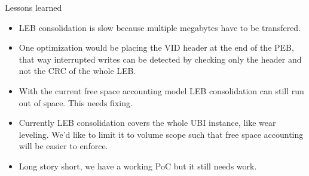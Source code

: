 \documentclass[aspectratio=169,obeyspaces,spaces,hyphens,dvipsnames]{beamer}
\begin{document}
\begin{frame}{Lessons learned}
  \begin{itemize}
  \item LEB consolidation is slow because multiple megabytes have to be transfered.
  \item One optimization would be placing the VID header at the end of the PEB,
        that way interrupted writes can be detected by checking only the header and
        not the CRC of the whole LEB.
  \item With the current free space accounting model LEB consolidation can still run out of
        space. This needs fixing.
  \item Currently LEB consolidation covers the whole UBI instance, like wear leveling.
        We'd like to limit it to volume scope such that free space accounting will be easier
        to enforce.
  \item Long story short, we have a working PoC but it still needs work.
  \end{itemize}
\end{frame}
\end{document}
